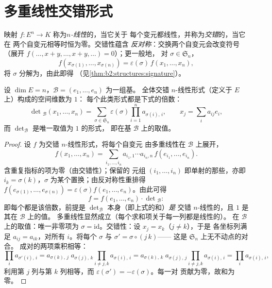 \section{多重线性交错形式}

\begin{definition}\label{def:b2:linalg:alternating}
映射 $f \colon E^n \to K$ 称为\emph{$n$-线性}的，当它关于
每个变元都线性，并称为\emph{交错}的，当它在
两个自变元相等时恒为零。交错性蕴含
\emph{反对称}：交换两个自变元会改变符号
（展开 $f(\dots, x + y, \dots, x + y, \dots) = 0$）；更一般地，
对 $\sigma \in \mathfrak{S}_n$，
\[
f(x_{\sigma(1)}, \dots, x_{\sigma(n)}) =
\varepsilon(\sigma)\, f(x_1, \dots, x_n),
\]
将 $\sigma$ 分解为，由此即得
（见\cref{thm:b2:structures:signature}）。
\end{definition}

\begin{theorem}[行列式基本定理]\label{thm:b2:linalg:detspace}
设 $\dim E = n$，$\mathcal{B} = (e_1, \dots, e_n)$ 为一组基。
全体交错 $n$-线性形式（定义于 $E$ 上）构成的空间维数为 $1$：
每个此类形式都是下式的倍数：
\[
\det{}_{\mathcal{B}}(x_1, \dots, x_n)
= \sum_{\sigma \in \mathfrak{S}_n} \varepsilon(\sigma)
\prod_{i=1}^{n} a_{\sigma(i),\,i},
\qquad
x_j = \sum_{i} a_{ij} e_i ,
\]
而 $\det_{\mathcal{B}}$ 是唯一取值为 $1$ 的形式，
即在基 $\mathcal{B}$ 上的取值。
\end{theorem}

\begin{proof}
设 $f$ 为交错 $n$-线性形式，将每个自变元
由多重线性在 $\mathcal{B}$ 上展开，
\[
f(x_1, \dots, x_n)
= \sum_{i_1, \dots, i_n} a_{i_1,1}\cdots a_{i_n,n}\,
f(e_{i_1}, \dots, e_{i_n}).
\]
含重复指标的项为零（由交错性）；保留的
元组 $(i_1, \dots, i_n)$ 即单射的那些，亦即 $i_k =
\sigma(k)$，$\sigma$ 为某个置换；由反对称性重排得
$f(e_{\sigma(1)}, \dots, e_{\sigma(n)}) = \varepsilon(\sigma)
f(e_1, \dots, e_n)$。由此可得
\[
f = f(e_1, \dots, e_n) \cdot \det{}_{\mathcal{B}} :
\]
即每个都是该倍数，前提是
$\det_{\mathcal{B}}$ 本身（即上式的和）\emph{是}
交错 $n$-线性的，且 $1$ 是其在 $\mathcal B$ 上的值。
多重线性显然成立（每个求和项关于每一列都是线性的）。
在 $\mathcal B$ 上的取值：唯一非零项为 $\sigma =
\mathrm{id}$。交错性：设 $x_j = x_k$（$j \neq k$），于是
各坐标列满足 $a_{i j} = a_{i k}$，对所有
$i$。将每个 $\sigma$ 与 $\sigma' = \sigma\circ(j\,k)$——
这是 $\mathfrak{S}_n$ 上无不动点的对合。
成对的两项乘积相等：
\[
\prod_i a_{\sigma'(i),\,i}
= a_{\sigma(k),\,j}\; a_{\sigma(j),\,k}
\prod_{i \neq j,k} a_{\sigma(i),\,i}
= a_{\sigma(k),\,k}\; a_{\sigma(j),\,j}
\prod_{i \neq j,k} a_{\sigma(i),\,i}
= \prod_i a_{\sigma(i),\,i},
\]
利用第 $j$ 列与第 $k$ 列相等，而
$\varepsilon(\sigma') = -\varepsilon(\sigma)$。每一对
贡献为零，故和为零。
\end{proof}

